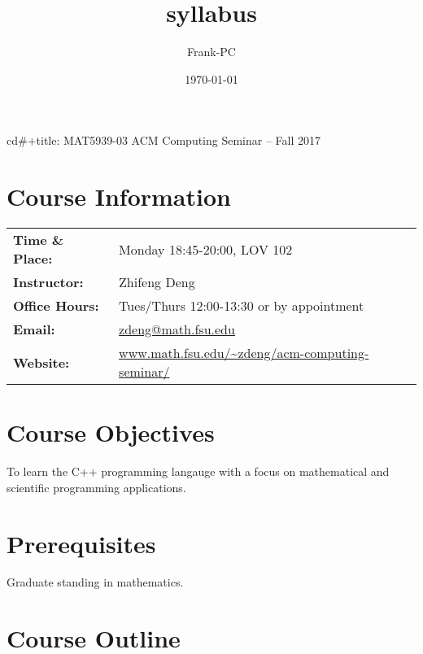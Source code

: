 \documentclass[11pt]{article}
\author{Frank-PC}
\date{\today}
\title{syllabus}
\begin{document}
\maketitle
cd\#+title: MAT5939-03 ACM Computing Seminar – Fall 2017

\section*{Course Information}
\label{sec-1}

\begin{center}
\begin{tabular}{ll}
\textbf{Time \& Place:} & Monday 18:45-20:00, LOV 102\\
\textbf{Instructor:} & Zhifeng Deng\\
\textbf{Office Hours:} & Tues/Thurs 12:00-13:30 or by appointment\\
\textbf{Email:} & \href{mailto:zdeng@math.fsu.edu?subject=MAT5939 ... }{zdeng@math.fsu.edu}\\
\textbf{Website:} & \href{./}{www.math.fsu.edu/\textasciitilde{}zdeng/acm-computing-seminar/}\\
\end{tabular}
\end{center}

\section*{Course Objectives}
\label{sec-2}

To learn the C++ programming langauge with a focus on  mathematical 
and scientific programming applications.

\section*{Prerequisites}
\label{sec-3}

Graduate standing in mathematics.

\section*{Course Outline}
\label{sec-4}
\end{document}
